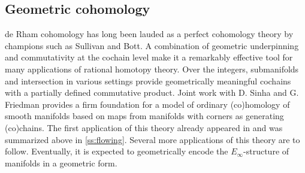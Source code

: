 \subsection{Geometric cohomology} \label{ss:geometric cohomology}

de Rham cohomology has long been lauded as a perfect cohomology theory by champions such as Sullivan and Bott.
A combination of geometric underpinning and commutativity at the cochain level make it a remarkably effective tool for many applications of rational homotopy theory.
Over the integers, submanifolds and intersection in various settings provide geometrically meaningful cochains with a partially defined commutative product.
Joint work with D. Sinha and G. Friedman provides a firm foundation for a model of ordinary (co)homology of smooth manifolds based on maps from manifolds with corners as generating (co)chains.
The first application of this theory already appeared in \cite{medina2021flowing} and was summarized above in \cref{ss:flowing}.
Several more applications of this theory are to follow.
Eventually, it is expected to geometrically encode the $E_\infty$-structure of manifolds in a geometric form.